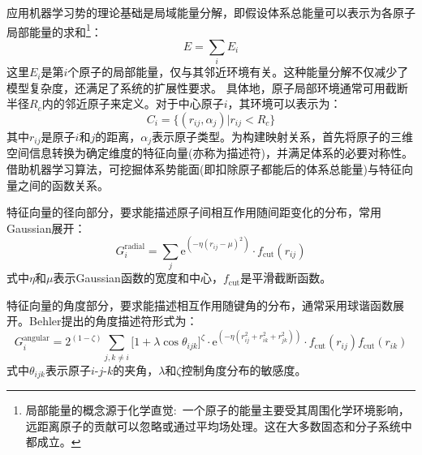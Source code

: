应用机器学习势的理论基础是局域能量分解，即假设体系总能量可以表示为各原子局部能量的求和\footnote{局部能量的概念源于化学直觉:~一个原子的能量主要受其周围化学环境影响，远距离原子的贡献可以忽略或通过平均场处理。这在大多数固态和分子系统中都成立。}：
\begin{equation}
E = \sum_i E_i
	\label{eq:MLP-2}
\end{equation}
这里$E_i$是第$i$个原子的局部能量，仅与其邻近环境有关。这种能量分解不仅减少了模型复杂度，还满足了系统的扩展性要求。
%
%
%
%
%
具体地，原子局部环境通常可用截断半径$R_c$内的邻近原子来定义。对于中心原子$i$，其环境可以表示为：
\begin{equation}
	C_i = \{(r_{ij}, \alpha_j) | r_{ij} < R_c\}
	\label{eq:MLP-3}
\end{equation}
其中$r_{ij}$是原子$i$和$j$的距离，$\alpha_j$表示原子类型。为构建映射关系，首先将原子的三维空间信息转换为确定维度的特征向量(亦称为描述符)，并满足体系的必要对称性。借助机器学习算法，可挖掘体系势能面(即扣除原子都能后的体系总能量)与特征向量之间的函数关系。%

特征向量的径向部分，要求能描述原子间相互作用随间距变化的分布，常用\textrm{Gaussian}展开：
\begin{equation}
	G_i^{\mathrm{radial}} = \sum_j\mathrm{e}^{(-\eta(r_{ij} - \mu)^2)}\cdot f_{\mathrm{cut}}(r_{ij})
	\label{eq:MLP-4}
\end{equation}
式中$\eta$和$\mu$表示\textrm{Gaussian}函数的宽度和中心，$f_{\mathrm{cut}}$是平滑截断函数。%

特征向量的角度部分，要求能描述相互作用随键角的分布，通常采用球谐函数展开。\textrm{Behler}提出的角度描述符形式为：
\begin{equation}
	G_i^{\mathrm{angular}} = 2^{(1-\zeta)} \sum_{j,k\neq i} \bigg[1+\lambda\cos\theta_{ijk}\bigg]^{\zeta}\cdot\mathrm{e}^{(-\eta(r_{ij}^2+r_{ik}^2+r_{jk}^2))}\cdot f_{\mathrm{cut}}(r_{ij})f_{\mathrm{cut}}(r_{ik})
	\label{eq:MLP-5}
\end{equation}
式中$\theta_{ijk}$表示原子$i$-$j$-$k$的夹角，$\lambda$和$\zeta$控制角度分布的敏感度。

